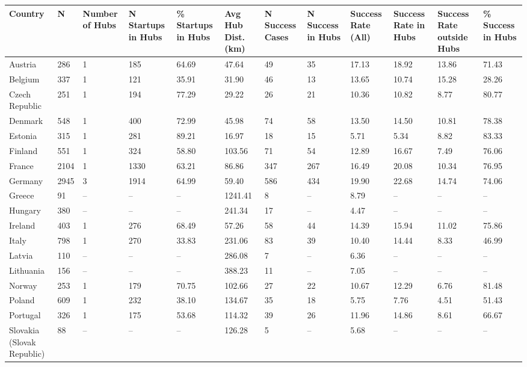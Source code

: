 \begin{tabular}{llllllllllll}
  \toprule
Country & N & Number of Hubs & N Startups in Hubs & \% Startups in Hubs & Avg Hub Dist. (km) & N Success Cases & N Success in Hubs & Success Rate (All) & Success Rate in Hubs & Success Rate outside Hubs & \% Success in Hubs \\ 
  \midrule
Austria & 286 & 1 & 185 & 64.69 & 47.64 & 49 & 35 & 17.13 & 18.92 & 13.86 & 71.43 \\ 
  Belgium & 337 & 1 & 121 & 35.91 & 31.90 & 46 & 13 & 13.65 & 10.74 & 15.28 & 28.26 \\ 
  Czech Republic & 251 & 1 & 194 & 77.29 & 29.22 & 26 & 21 & 10.36 & 10.82 & 8.77 & 80.77 \\ 
  Denmark & 548 & 1 & 400 & 72.99 & 45.98 & 74 & 58 & 13.50 & 14.50 & 10.81 & 78.38 \\ 
  Estonia & 315 & 1 & 281 & 89.21 & 16.97 & 18 & 15 & 5.71 & 5.34 & 8.82 & 83.33 \\ 
  Finland & 551 & 1 & 324 & 58.80 & 103.56 & 71 & 54 & 12.89 & 16.67 & 7.49 & 76.06 \\ 
  France & 2104 & 1 & 1330 & 63.21 & 86.86 & 347 & 267 & 16.49 & 20.08 & 10.34 & 76.95 \\ 
  Germany & 2945 & 3 & 1914 & 64.99 & 59.40 & 586 & 434 & 19.90 & 22.68 & 14.74 & 74.06 \\ 
  Greece & 91 & – & – & – & 1241.41 & 8 & – & 8.79 & – & – & – \\ 
  Hungary & 380 & – & – & – & 241.34 & 17 & – & 4.47 & – & – & – \\ 
  Ireland & 403 & 1 & 276 & 68.49 & 57.26 & 58 & 44 & 14.39 & 15.94 & 11.02 & 75.86 \\ 
  Italy & 798 & 1 & 270 & 33.83 & 231.06 & 83 & 39 & 10.40 & 14.44 & 8.33 & 46.99 \\ 
  Latvia & 110 & – & – & – & 286.08 & 7 & – & 6.36 & – & – & – \\ 
  Lithuania & 156 & – & – & – & 388.23 & 11 & – & 7.05 & – & – & – \\ 
  Norway & 253 & 1 & 179 & 70.75 & 102.66 & 27 & 22 & 10.67 & 12.29 & 6.76 & 81.48 \\ 
  Poland & 609 & 1 & 232 & 38.10 & 134.67 & 35 & 18 & 5.75 & 7.76 & 4.51 & 51.43 \\ 
  Portugal & 326 & 1 & 175 & 53.68 & 114.32 & 39 & 26 & 11.96 & 14.86 & 8.61 & 66.67 \\ 
  Slovakia (Slovak Republic) & 88 & – & – & – & 126.28 & 5 & – & 5.68 & – & – & – \\ 

\end{tabular}
